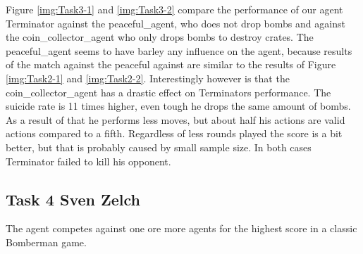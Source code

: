 \documentclass[
	letterpaper, %
	12pt, %
]{CSUniSchoolLabReport}
\begin{document}
Figure \ref{img:Task3-1} and \ref{img:Task3-2} compare the performance of our agent Terminator against the peaceful\_agent, who does not drop bombs and against the coin\_collector\_agent who only drops bombs to destroy crates.
The peaceful\_agent seems to have barley any influence on the agent, because results of the match against the peaceful against are similar to the results of Figure \ref{img:Task2-1} and \ref{img:Task2-2}.
Interestingly however is that the coin\_collector\_agent has a drastic effect on Terminators performance.
The suicide rate is 11 times higher, even tough he drops the same amount of bombs.
As a result of that he performs less moves, but about half his actions are valid actions compared to a fifth.
Regardless of less rounds played the score is a bit better, but that is probably caused by small sample size.
In both cases Terminator failed to kill his opponent.

\subsection{Task 4 \tiny Sven Zelch}

The agent competes against one ore more agents for the highest score in a classic Bomberman game.
\end{document}
